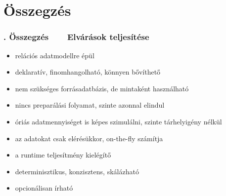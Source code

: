 \documentclass[
    aspectratio=169,
]{beamer}
\newcommand{\slidetitle}[2]{\frametitle{{\small #1 ~ \ding{226} ~ } \normalsize \textbf{#2} }}
\newcommand{\greencheck}{{\color{green!65!black}\ding{51}}}
\begin{document}
\begin{frame}
\end{frame}

\section{Összegzés}
\def\sectionshorttitle{. Összegzés}

\begin{frame}
    \slidetitle{\sectionshorttitle}{Elvárások teljesítése}
    
    \begin{itemize}
        \setlength\itemsep{0.5em}
        \item[\greencheck] relációs adatmodellre épül
        \item[\greencheck] deklaratív, finomhangolható, könnyen bővíthető
        \item[\greencheck] nem szükséges forrásadatbázis, de mintaként használható
        \item[\greencheck] nincs preparálási folyamat, szinte azonnal elindul
        \item[\greencheck] óriás adatmennyiséget is képes szimulálni, szinte tárhelyigény nélkül
        \item[\greencheck] az adatokat csak elérésükkor, on-the-fly számítja
        \item[\greencheck] a runtime teljesítmény kielégítő
        \item[\greencheck] determinisztikus, konzisztens, skálázható
        \item[\greencheck] opcionálisan írható
    \end{itemize}
\end{frame}
\end{document}
